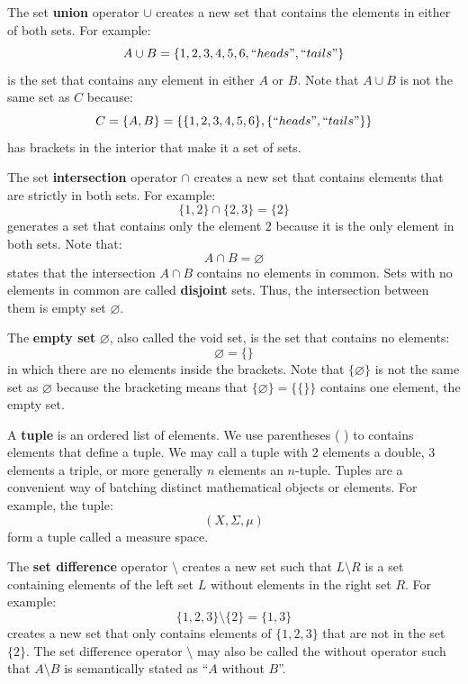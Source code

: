 \documentclass[10pt, a5paper, twoside, openright]{memoir}
\begin{document}
The set \textbf{union} operator $\cup$ creates a new set that contains the elements in either of both sets. For example:
$$A \cup B = \{ {1,2,3,4,5,6, \textnormal{``} heads \textnormal{''}, \textnormal{``} tails \textnormal{''} } \}$$
is the set that contains any element in either $A$ or $B$. Note that $A \cup B$ is not the same set as $C$ because:
$$C = \{ {A,B} \} = \{ \{ {1,2,3,4,5,6} \}, \{ { \textnormal{``} heads \textnormal{''}, \textnormal{``} tails \textnormal{''} } \} \}$$
has brackets in the interior that make it a set of sets.

The set \textbf{intersection} operator $\cap$ creates a new set that contains elements that are strictly in both sets. For example:
$$\{ {1,2}\} \cap \{ {2,3}\} = \{ {2} \}$$
generates a set that contains only the element $2$ because it is the only element in both sets. Note that:
$$A \cap B = \varnothing$$
states that the intersection $A \cap B$ contains no elements in common. Sets with no elements in common are called \textbf{disjoint} sets. Thus, the intersection between them is empty set $\varnothing$.

The \textbf{empty set} $\varnothing$, also called the void set, is the set that contains no elements:
$$\varnothing = \{ \}$$
in which there are no elements inside the brackets. Note that $\{ \varnothing \}$ is not the same set as $\varnothing$ because the bracketing means that $\{ \varnothing \} = \{ \{ \} \}$ contains one element, the empty set.

A \textbf{tuple} is an ordered list of elements. We use parentheses ( ) to contains elements that define a tuple. We may call a tuple with $2$ elements a double, $3$ elements a triple, or more generally $n$ elements an $n$-tuple. Tuples are a convenient way of batching distinct mathematical objects or elements. For example, the tuple:
$$({X, \Sigma, \mu})$$
form a tuple called a measure space.

The \textbf{set difference} operator $\setminus$ creates a new set such that $L \setminus R$ is a set containing elements of the left set $L$ without elements in the right set $R$. For example:
$$\{ {1,2,3} \} \setminus \{ {2} \} = \{ {1,3} \}$$
creates a new set that only contains elements of $\{ {1,2,3} \}$ that are not in the set $\{ {2} \}$. The set difference operator $\setminus$ may also be called the without operator such that $A \setminus B$ is semantically stated as ``$A$ without $B$''.
\end{document}
